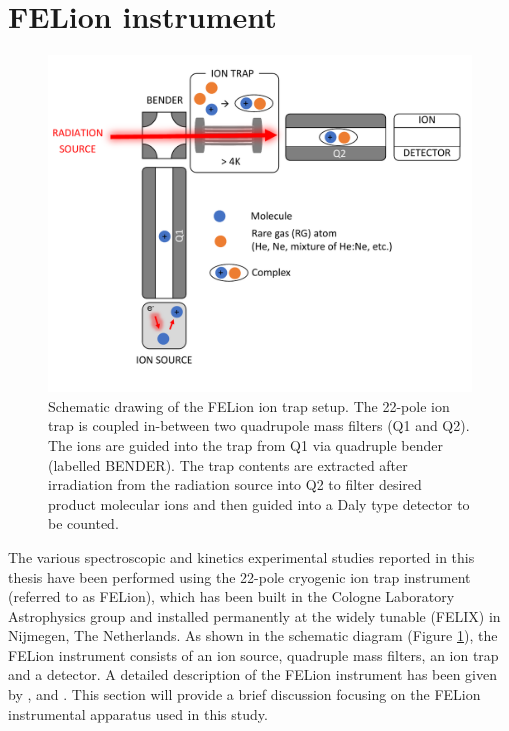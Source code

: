 \section{FELion instrument}
\label{sec:felion}

\begin{figure}[!b]
    \centering
    \includegraphics[width=1\textwidth]{figures/Instruments/FELion_schematics.pdf}
    
    \caption{Schematic drawing of the FELion ion trap setup. The 22-pole ion trap is coupled in-between two quadrupole mass filters (Q1 and Q2). The ions are guided into the trap from Q1 via quadruple bender (labelled BENDER). The trap contents are extracted after irradiation from the radiation source into Q2 to filter desired product molecular ions and then guided into a Daly type detector to be counted.}
    \label{fig:felion}
\end{figure}

The various spectroscopic and kinetics experimental studies reported in this thesis have been performed using the 22-pole cryogenic ion trap instrument (referred to as FELion), which has been built in the Cologne Laboratory Astrophysics group and installed permanently at the widely tunable  (FELIX) \cite{oepts_free-electron-laser_1995} in Nijmegen, The Netherlands. As shown in the schematic diagram (Figure \ref{fig:felion}), the FELion instrument consists of an ion source, quadruple mass filters, an ion trap and a detector. A detailed description of the FELion instrument has been given by \citet{asvany_coltrap_2014}, \citet{kluge_state-selective_2016} and \citet{jusko_felion_2019}. This section will provide a brief discussion focusing on the FELion instrumental apparatus used in this study.

